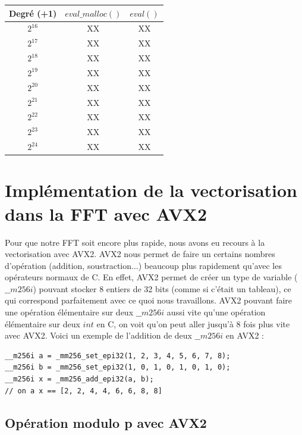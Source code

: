 \documentclass[12pt, a4paper]{article}
\begin{document}
\begin{center}
\begin{tabular}{||c c c||}
\hline
Degré (+1) & $eval\_malloc()$ & $eval()$ \\
\hline\hline
$2^{16}$ & XX & XX \\
\hline
$2^{17}$ & XX & XX \\
\hline
$2^{18}$ & XX & XX \\
\hline
$2^{19}$ & XX & XX \\
\hline
$2^{20}$ & XX & XX \\
\hline
$2^{21}$ & XX & XX \\
\hline
$2^{22}$ & XX & XX \\
\hline
$2^{23}$ & XX & XX \\
\hline
$2^{24}$ & XX & XX \\
\hline
\end{tabular}
\end{center}

\section{Implémentation de la vectorisation dans la FFT avec AVX2}

Pour que notre FFT soit encore plus rapide, nous avons eu recours à la vectorisation avec AVX2. AVX2 nous permet de faire un certains nombres d'opération (addition, soustraction...) beaucoup plus rapidement qu'avec les opérateurs normaux de C. En effet, AVX2 permet de créer un type de variable ($\_\_m256i$) pouvant stocker 8 entiers de 32 bits (comme si c'était un tableau), ce qui correspond parfaitement avec ce quoi nous travaillons. AVX2 pouvant faire une opération élémentaire sur deux $\_\_m256i$ aussi vite qu'une opération élémentaire sur deux $int$ en C, on voit qu'on peut aller jusqu'à 8 fois plus vite avec AVX2. Voici un exemple de l'addition de deux $\_\_m256i$ en AVX2 : 

\begin{lstlisting}
__m256i a = _mm256_set_epi32(1, 2, 3, 4, 5, 6, 7, 8);
__m256i b = _mm256_set_epi32(1, 0, 1, 0, 1, 0, 1, 0);
__m256i x = _mm256_add_epi32(a, b);
// on a x == [2, 2, 4, 4, 6, 6, 8, 8]
\end{lstlisting}

\subsection{Opération modulo p avec AVX2}
\end{document}
